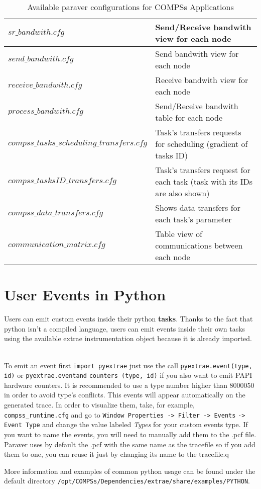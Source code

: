 \newpage

\bgroup
  \def\arraystretch{1.5}
  \begin{table}[!ht]
    \begin{center}
      \begin{tabular}{| p{} | p{} |}
	\hline
	$sr\_bandwith.cfg$ 			& Send/Receive bandwith view for each node \\ \hline
	$send\_bandwith.cfg$ 			& Send bandwith view for each node \\ \hline
	$receive\_bandwith.cfg$ 		& Receive bandwith view for each node \\ \hline
	$process\_bandwith.cfg$ 		& Send/Receive bandwith table for each node \\ \hline
	$compss\_tasks\_scheduling\_transfers.cfg$ 		& Task's transfers requests for scheduling (gradient of tasks ID) \\ \hline
	$compss\_tasksID\_transfers.cfg$ 	& Task's transfers request for each task (task with its IDs are also shown) \\ \hline
	$compss\_data\_transfers.cfg$ 		& Shows data transfers for each task's parameter \\ \hline
	$communication\_matrix.cfg$ 		& Table view of communications between each node \\ \hline
      \end{tabular}
      \caption{Available paraver configurations for COMPSs Applications}
      \label{tab:paraver_configs_comm}
    \end{center}
  \end{table}
\egroup


\section{User Events in Python}

Users can emit custom events inside their python \textbf{tasks}. Thanks to the fact that python isn't a compiled language, 
users can emit events inside their own tasks using the available extrae instrumentation object because it is already imported.
~ \newline

To emit an event first \verb|import pyextrae| just use the call \verb|pyextrae.event(type, id)| or \verb|pyextrae.eventand| \verb|counters (type, id)|
if you also want to emit PAPI hardware counters. It is recommended to use a type number higher than 8000050 in order 
to avoid type's conflicts. This events will appear automatically on the generated trace. In order to visualize them, take, 
for example, \verb|compss_runtime.cfg| and go to \verb|Window Properties -> Filter -> Events| \verb|-> Event Type| and change the 
value labeled \textit{Types} for your custom events type. If you want to name the events, you will need to manually add them to the .pcf file. Paraver uses by default the .pcf with the same name as the tracefile so if you add them to one, you can reuse it just by changing its name to the tracefile.q
~ \newline

More information and examples of common python usage can be found under the default directory 
\verb|/opt/COMPSs/Dependencies/extrae/share/examples/PYTHON|.
